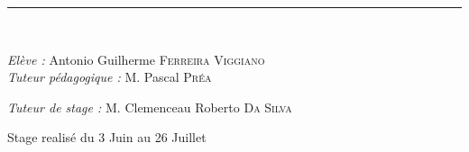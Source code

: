 \begin{titlepage}
\begin{center}
\hrule  ~\\[1.5cm]


\end{center}



\large\emph{Elève :} \hfill Antonio Guilherme \textsc{Ferreira Viggiano} ~\\

\large\emph{Tuteur pédagogique :} \hfill M. Pascal \textsc{Préa}

\large\emph{Tuteur de stage :} \hfill M. Clemenceau Roberto \textsc{Da Silva}

\vfill

\begin{center}
  \large Stage realisé du 3 Juin au 26 Juillet
\end{center}






\end{titlepage}
